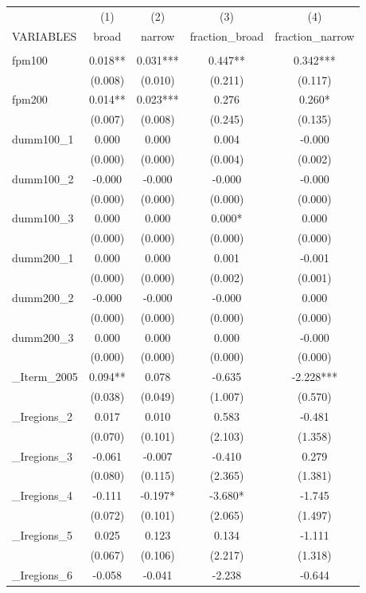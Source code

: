 \documentclass[]{article}
\begin{document}
\begin{tabular}{lcccc} \hline
 & (1) & (2) & (3) & (4) \\
VARIABLES & broad & narrow & fraction\_broad & fraction\_narrow \\ \hline
 &  &  &  &  \\
fpm100 & 0.018** & 0.031*** & 0.447** & 0.342*** \\
 & (0.008) & (0.010) & (0.211) & (0.117) \\
fpm200 & 0.014** & 0.023*** & 0.276 & 0.260* \\
 & (0.007) & (0.008) & (0.245) & (0.135) \\
dumm100\_1 & 0.000 & 0.000 & 0.004 & -0.000 \\
 & (0.000) & (0.000) & (0.004) & (0.002) \\
dumm100\_2 & -0.000 & -0.000 & -0.000 & -0.000 \\
 & (0.000) & (0.000) & (0.000) & (0.000) \\
dumm100\_3 & 0.000 & 0.000 & 0.000* & 0.000 \\
 & (0.000) & (0.000) & (0.000) & (0.000) \\
dumm200\_1 & 0.000 & 0.000 & 0.001 & -0.001 \\
 & (0.000) & (0.000) & (0.002) & (0.001) \\
dumm200\_2 & -0.000 & -0.000 & -0.000 & 0.000 \\
 & (0.000) & (0.000) & (0.000) & (0.000) \\
dumm200\_3 & 0.000 & 0.000 & 0.000 & -0.000 \\
 & (0.000) & (0.000) & (0.000) & (0.000) \\
\_Iterm\_2005 & 0.094** & 0.078 & -0.635 & -2.228*** \\
 & (0.038) & (0.049) & (1.007) & (0.570) \\
\_Iregions\_2 & 0.017 & 0.010 & 0.583 & -0.481 \\
 & (0.070) & (0.101) & (2.103) & (1.358) \\
\_Iregions\_3 & -0.061 & -0.007 & -0.410 & 0.279 \\
 & (0.080) & (0.115) & (2.365) & (1.381) \\
\_Iregions\_4 & -0.111 & -0.197* & -3.680* & -1.745 \\
 & (0.072) & (0.101) & (2.065) & (1.497) \\
\_Iregions\_5 & 0.025 & 0.123 & 0.134 & -1.111 \\
 & (0.067) & (0.106) & (2.217) & (1.318) \\
\_Iregions\_6 & -0.058 & -0.041 & -2.238 & -0.644 \\

\end{tabular}
\end{document}
